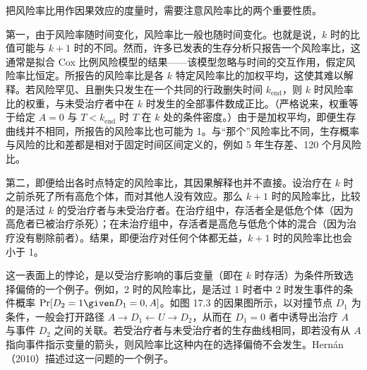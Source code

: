 \begin{finepoint}[风险率比的隐患]
把风险率比用作因果效应的度量时，需要注意风险率比的两个重要性质。

第一，由于风险率随时间变化，风险率比一般也随时间变化。也就是说，$k$ 时的比值可能与 $k+1$ 时的不同。然而，许多已发表的生存分析只报告一个风险率比，这通常是拟合 Cox 比例风险模型的结果——该模型忽略与时间的交互作用，假定风险率比恒定。所报告的风险率比是各 $k$ 特定风险率比的加权平均，这使其难以解释。若风险罕见、且删失只发生在一个共同的行政删失时间 $k_{\text{end}}$，则 $k$ 时风险率比的权重，与未受治疗者中在 $k$ 时发生的全部事件数成正比。（严格说来，权重等于给定 $A=0$ 与 $T<k_{\text{end}}$ 时 $T$ 在 $k$ 处的条件密度。）由于是加权平均，即便生存曲线并不相同，所报告的风险率比也可能为 1。与“那个”风险率比不同，生存概率与风险的比和差都是相对于固定时间区间定义的，例如 5 年生存差、120 个月风险比。

第二，即便给出各时点特定的风险率比，其因果解释也并不直接。设治疗在 $k$ 时之前杀死了所有高危个体，而对其他人没有效应。那么 $k+1$ 时的风险率比，比较的是活过 $k$ 的受治疗者与未受治疗者。在治疗组中，存活者全是低危个体（因为高危者已被治疗杀死）；在未治疗组中，存活者是高危与低危个体的混合（因为治疗没有剔除前者）。结果，即便治疗对任何个体都无益，$k+1$ 时的风险率比也会小于 1。

这一表面上的悖论，是以受治疗影响的事后变量（即在 $k$ 时存活）为条件所致选择偏倚的一个例子。例如，2 时的风险率比，是活过 1 时者中 2 时发生事件的条件概率 $\Pr[D_2=1\given D_1=0,A]$。如图 17.3 的因果图所示，以对撞节点 $D_1$ 为条件，一般会打开路径 $A\to D_1\leftarrow U\to D_2$，从而在 $D_1=0$ 者中诱导出治疗 $A$ 与事件 $D_2$ 之间的关联。若受治疗者与未受治疗者的生存曲线相同，即若没有从 $A$ 指向事件指示变量的箭头，则风险率比这种内在的选择偏倚不会发生。Hernán（2010）描述过这一问题的一个例子。
\end{finepoint}

\begin{figure}[htbp]
\centering
{}
\caption{}
\label{fig:17.3}
\end{figure}

